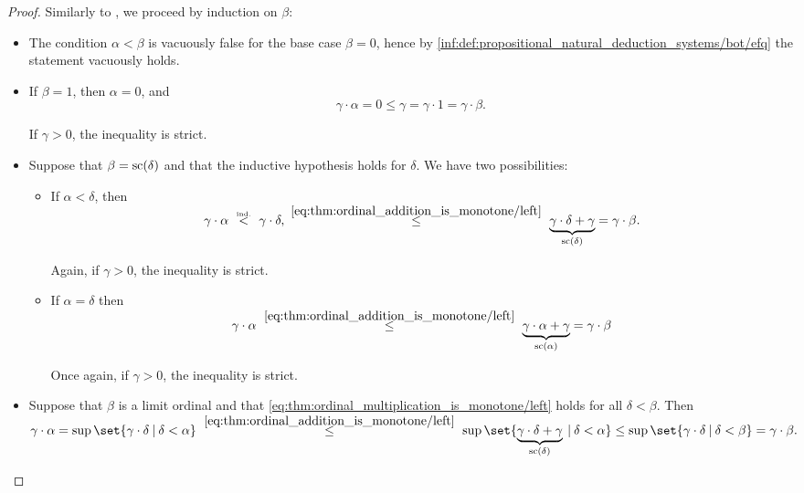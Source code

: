 \begin{proof}
   Similarly to , we proceed by induction on \( \beta \):
  \begin{itemize}
    \item The condition \( \alpha < \beta \) is vacuously false for the base case \( \beta = 0 \), hence by \ref{inf:def:propositional_natural_deduction_systems/bot/efq} the statement vacuously holds.

    \item If \( \beta = 1 \), then \( \alpha = 0 \), and
    \begin{equation}\label{thm:ordinal_multiplication_is_monotone/left/ind_base}
      \gamma \cdot \alpha = 0 \leq \gamma = \gamma \cdot 1 = \gamma \cdot \beta.
    \end{equation}

    If \( \gamma > 0 \), the inequality is strict.

    \item Suppose that \( \beta = \op{sc}(\delta) \) and that the inductive hypothesis holds for \( \delta \). We have two possibilities:
    \begin{itemize}
      \item If \( \alpha < \delta \), then
      \begin{equation*}
        \gamma \cdot \alpha
        \reloset {\T{ind.}} <
        \gamma \cdot \delta,
        \reloset {\eqref{eq:thm:ordinal_addition_is_monotone/left}} \leq
        \underbrace{\gamma \cdot \delta + \gamma}_{\op{sc}(\delta)}
        =
        \gamma \cdot \beta.
      \end{equation*}

      Again, if \( \gamma > 0 \), the inequality is strict.

      \item If \( \alpha = \delta \) then
      \begin{equation*}
        \gamma \cdot \alpha
        \reloset {\eqref{eq:thm:ordinal_addition_is_monotone/left}} \leq
        \underbrace{\gamma \cdot \alpha + \gamma}_{\op{sc}(\alpha)}
        =
        \gamma \cdot \beta
      \end{equation*}

      Once again, if \( \gamma > 0 \), the inequality is strict.
    \end{itemize}

    \item Suppose that \( \beta \) is a limit ordinal and that \eqref{eq:thm:ordinal_multiplication_is_monotone/left} holds for all \( \delta < \beta \). Then
    \begin{equation*}
      \gamma \cdot \alpha
      =
      \sup\set{ \gamma \cdot \delta \given \delta < \alpha }
      \reloset {\eqref{eq:thm:ordinal_addition_is_monotone/left}} \leq
      \sup\set{ \underbrace{\gamma \cdot \delta + \gamma}_{\op{sc}(\delta)} \given \delta < \alpha }
      \leq
      \sup\set{ \gamma \cdot \delta \given \delta < \beta }
      =
      \gamma \cdot \beta.
    \end{equation*}


\end{itemize}
\end{proof}
